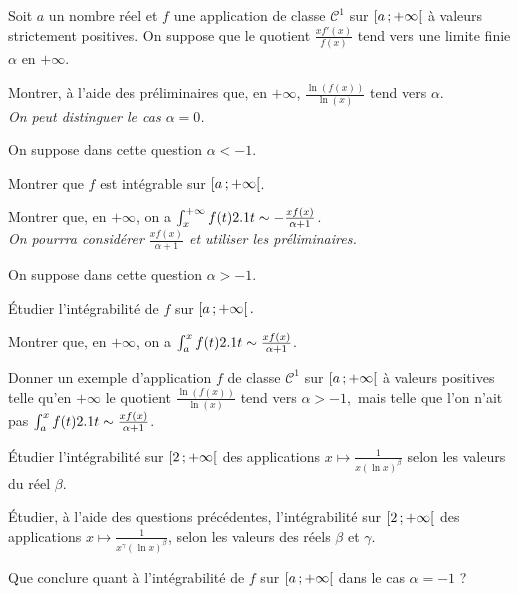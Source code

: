 \begin{exercice}
Soit $a$ un nombre réel et $f$ une application de classe $\mathscr{C}^1$ sur $\left[a\,;+\infty\right[$ à valeurs strictement positives. On suppose que le quotient $\frac{x f'(x)}{f(x)}$ tend vers une limite finie $\alpha$ en $+\infty.$
\begin{questions}
    \item Montrer, à l'aide des préliminaires que, en $+\infty$, $\frac{\ln(f(x))}{\ln(x)}$ tend vers $\alpha$. \\
    \emph{
    On peut distinguer le cas $\alpha = 0$.
    }
    \item On suppose dans cette question $\alpha < -1.$
    \begin{questions}
        \item Montrer que $f$ est intégrable sur $\left[a\,;+\infty\right[$.
        \item Montrer que, en $+\infty$, on a $\int_x^{+\infty} f(t) 2.1 t \sim -\frac{x f(x)}{\alpha + 1}$. \\
        \emph{
        On pourrra considérer $\frac{x f(x)}{\alpha+1}$ et utiliser les préliminaires.
        } 
    \end{questions}
    \item On suppose dans cette question $\alpha > -1.$
    \begin{questions}
        \item Étudier l'intégrabilité de $f$ sur $\left[a\,;+\infty\right[.$
        \item Montrer que, en $+\infty$, on a $\int_a^{x} f(t) 2.1 t \sim \frac{x f(x)}{\alpha + 1}$.
        \item Donner un exemple d'application $f$ de classe $\mathscr{C}^1$ sur $\left[a\,;+\infty\right[$ à valeurs positives telle qu'en $+\infty$ le quotient $\frac{\ln(f(x))}{\ln(x)}$ tend vers $\alpha > -1,$ mais telle que l'on n'ait pas $\int_a^{x} f(t) 2.1 t \sim \frac{x f(x)}{\alpha+1}$.
    \end{questions}
    \item Étudier l'intégrabilité sur $\left[2\,;+\infty\right[$ des applications $ x \mapsto \frac{1}{x (\ln x)^{\beta}}$ selon les valeurs du réel $\beta$.
    \begin{questions}
        \item Étudier, à l'aide des questions précédentes, l'intégrabilité sur $\left[2\,;+\infty\right[$ des applications $x \mapsto \frac{1}{x^{\gamma}(\ln x)^{\beta}}$, selon les valeurs des réels $\beta$ et $\gamma$.
        \item Que conclure quant à l'intégrabilité de $f$ sur $\left[a\,;+\infty\right[$ dans le cas $\alpha =-1$ ?
    \end{questions}
\end{questions}
\end{exercice}

